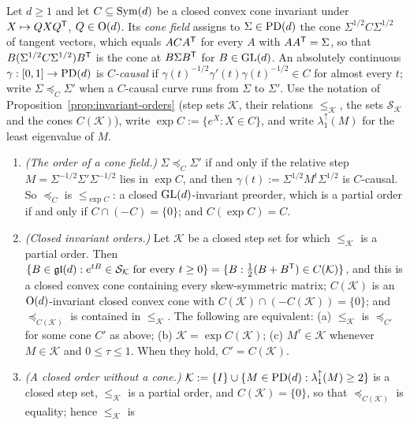 \begin{theorem}\label{thm:cone-orders}
Let $d \ge 1$ and let $C \subseteq \mathrm{Sym}(d)$ be a closed convex cone invariant under $X \mapsto QXQ^{\mathsf{T}}$,
$Q \in \mathrm{O}(d)$. Its \emph{cone field} assigns to $\Sigma \in \mathrm{PD}(d)$ the cone
$\Sigma^{1/2}C\Sigma^{1/2}$ of tangent vectors, which equals $ACA^{\mathsf{T}}$ for every $A$ with
$AA^{\mathsf{T}} = \Sigma$, so that $B(\Sigma^{1/2}C\Sigma^{1/2})B^{\mathsf{T}}$ is the cone at $B\Sigma B^{\mathsf{T}}$ for
$B \in \mathrm{GL}(d)$. An absolutely continuous $\gamma : [0,1] \to \mathrm{PD}(d)$ is \emph{$C$-causal} if
$\gamma(t)^{-1/2}\gamma'(t)\gamma(t)^{-1/2} \in C$ for almost every $t$; write $\Sigma \preceq_C \Sigma'$
when a $C$-causal curve runs from $\Sigma$ to $\Sigma'$. Use the notation of Proposition~\ref{prop:invariant-orders}
(step sets $\mathcal K$, their relations $\le_{\mathcal K}$, the sets $\mathcal S_{\mathcal K}$ and the cones
$C(\mathcal K)$), write $\exp C := \{e^X : X \in C\}$, and write $\lambda^\uparrow_1(M)$ for the least
eigenvalue of $M$.
\begin{enumerate}
\item \emph{(The order of a cone field.)} $\Sigma \preceq_C \Sigma'$ if and only if the relative step
$M = \Sigma^{-1/2}\Sigma'\Sigma^{-1/2}$ lies in $\exp C$, and then $\gamma(t) := \Sigma^{1/2}M^t\Sigma^{1/2}$
is $C$-causal. So $\preceq_C$ is $\le_{\exp C}$: a closed $\mathrm{GL}(d)$-invariant preorder, which is a partial
order if and only if $C \cap (-C) = \{0\}$; and $C(\exp C) = C$.
\item \emph{(Closed invariant orders.)} Let $\mathcal K$ be a closed step set for which $\le_{\mathcal K}$
is a partial order. Then
$\{B \in \mathfrak{gl}(d) : e^{tB} \in \mathcal S_{\mathcal K} \text{ for every } t \ge 0\} =
\{B : \tfrac12(B + B^{\mathsf{T}}) \in C(\mathcal K)\}$, and this is a closed convex cone containing every
skew-symmetric matrix; $C(\mathcal K)$ is an $\mathrm{O}(d)$-invariant closed convex cone with
$C(\mathcal K) \cap (-C(\mathcal K)) = \{0\}$; and $\preceq_{C(\mathcal K)}$ is contained in
$\le_{\mathcal K}$. The following are equivalent: (a) $\le_{\mathcal K}$ is $\preceq_{C'}$ for some cone
$C'$ as above; (b) $\mathcal K = \exp C(\mathcal K)$; (c) $M^\tau \in \mathcal K$ whenever
$M \in \mathcal K$ and $0 \le \tau \le 1$. When they hold, $C' = C(\mathcal K)$.
\item \emph{(A closed order without a cone.)} $\mathcal K := \{I\} \cup \{M \in \mathrm{PD}(d) :
\lambda^\uparrow_1(M) \ge 2\}$ is a closed step set, $\le_{\mathcal K}$ is a partial order, and
$C(\mathcal K) = \{0\}$, so that $\preceq_{C(\mathcal K)}$ is equality; hence $\le_{\mathcal K}$ is

\end{enumerate}
\end{theorem}
